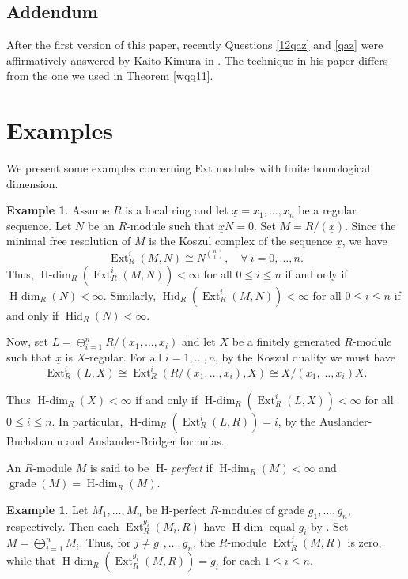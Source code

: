 \documentclass[11pt, a4paper,pagebackref]{amsart}
\numberwithin{equation}{section}
\theoremstyle{definition}
\newtheorem{remark and definition}[theorem]{Remark and Definition}
\newtheorem{remark and notation}[theorem]{Remark and Notation}
\newtheorem{example}[theorem]{Example}
\newcommand\Ext{\operatorname{Ext}}
\DeclareMathOperator{\Hdim}{H-dim}
\begin{document}
\subsection*{Addendum} After the first version of this paper, recently
Questions \ref{12qaz} and \ref{qaz} were affirmatively answered by Kaito Kimura in \cite{FinitenessOfHomologicalDimensionOfExtModules}. The technique in his paper differs from the one we used in 
Theorem \ref{wqq11}. 


\section{Examples}\label{sectionexamples}

We present some examples concerning Ext modules with finite homological dimension. 

\begin{example}
    Assume $R$ is a local ring and let $\underline{x}=x_1,\ldots,x_n$ be a regular sequence. Let $N$ be an $R$-module such that $\underline{x}N=0$. Set $M=R/(\underline{x})$. Since the minimal free resolution of $M$ is the Koszul complex of the sequence $\underline{x}$, we have
    $$\Ext^i_R(M,N)\cong N^{\binom{n}{i}}, \quad\forall \ i=0,\ldots,n.$$
    Thus, $\Hdim_R(\Ext^i_R(M,N))<\infty$ for all $0\leq i \leq n$ if and only if $\Hdim_R(N)<\infty.$ Similarly, $\operatorname{Hid}_R(\Ext^i_R(M,N))<\infty$ for all $0\leq i \leq n$ if and only if $\operatorname{Hid}_R(N)<\infty.$

    Now, set $L=\oplus_{i=1}^nR/(x_1,\ldots,x_i)$ and let $X$ be a finitely generated $R$-module such that $\underline{x}$ is $X$-regular. For all $i=1,\ldots,n$, by the Koszul duality we must have $$\Ext^i_R(L,X)\cong\Ext^i_R(R/(x_1,\ldots,x_i),X)\cong X/(x_1,\ldots,x_i)X.$$

    Thus $\operatorname{H-dim}_R(X)<\infty$ if and only if $\operatorname{H-dim}_R( \Ext_R^i(L,X))<\infty$ for all $0\leq i \leq n$. In particular,   $\Hdim_R(\Ext^i_R(L,R))=i$, by the Auslander-Buchsbaum and Auslander-Bridger formulas.
\end{example}

An $R$-module $M$ is said to be $\operatorname{H-}$\textit{perfect} if $\operatorname{H-dim}_R(M)<\infty$ and $\operatorname{grade}(M)=\operatorname{H-dim}_R(M)$.
\begin{example}
    Let $M_1,\ldots, M_n$ be H-perfect $R$-modules of grade $g_1,\ldots, g_n$, respectively. Then each  $\Ext_R^{g_i}(M_i, R)$ have $\operatorname{H-dim}$ equal $g_i$ by \cite[Theorem 6.3]{AbsoluteRelativeAndTateCohomologyOfModulesOfFiniteGorensteinDimension}. Set $M=\bigoplus_{i=1}^n M_i$. Thus, for  $j\not=g_1, \ldots, g_n$, the $R$-module $\Ext_R^j(M,R)$ is zero, while that $\operatorname{H-dim}_R(\Ext_R^{g_i}(M,R))=g_i$ for each $1\leq i \leq n$. 
\end{example}
\end{document}
